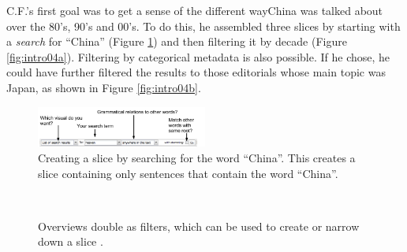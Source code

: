 \documentclass{sig-alternate}
\begin{document}
C.F.'s first goal was to get a sense of the different wayChina was talked about over the 80's, 90's and 00's. To do this, he assembled three slices by starting with a \emph{search} for ``China'' (Figure \ref{fig:intro03})  and then filtering it by decade (Figure \ref{fig:intro04a}).  Filtering by categorical metadata is also possible. If he chose, he could have further filtered the results to those editorials whose main topic was Japan, as shown in Figure \ref{fig:intro04b}. 
\begin{figure}[ht!]
\begin{center}
	\includegraphics[width=0.5\textwidth]{fig/intro/03b.png}
\end{center}
    \caption{%
        Creating a slice by searching for the word ``China''. This creates a slice containing only sentences that contain the word ``China''. \label{fig:intro03}
     }%
\end{figure}

\begin{figure}[ht!]
\begin{center}
%
        \\
%
    \end{center}
    \caption{%
     Overviews double as filters, which can be used to create or narrow down a slice \label{fig:intro04}.
     }%
\end{figure}
\end{document}
